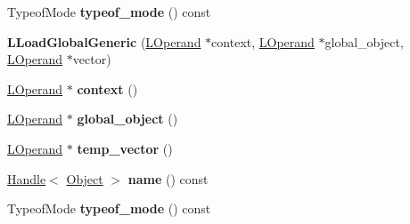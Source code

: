 \begin{DoxyCompactItemize}
\item 
Typeof\+Mode {\bfseries typeof\+\_\+mode} () const \hypertarget{classv8_1_1internal_1_1_l_load_global_generic_a92314902b26af0eba30f17b3c9e9d768}{}\label{classv8_1_1internal_1_1_l_load_global_generic_a92314902b26af0eba30f17b3c9e9d768}

\item 
{\bfseries L\+Load\+Global\+Generic} (\hyperlink{classv8_1_1internal_1_1_l_operand}{L\+Operand} $\ast$context, \hyperlink{classv8_1_1internal_1_1_l_operand}{L\+Operand} $\ast$global\+\_\+object, \hyperlink{classv8_1_1internal_1_1_l_operand}{L\+Operand} $\ast$vector)\hypertarget{classv8_1_1internal_1_1_l_load_global_generic_a5992cad6cdc59da767d3d35fdbf4c4f7}{}\label{classv8_1_1internal_1_1_l_load_global_generic_a5992cad6cdc59da767d3d35fdbf4c4f7}

\item 
\hyperlink{classv8_1_1internal_1_1_l_operand}{L\+Operand} $\ast$ {\bfseries context} ()\hypertarget{classv8_1_1internal_1_1_l_load_global_generic_acb9446dcc83f4319988b01ff0d957bf6}{}\label{classv8_1_1internal_1_1_l_load_global_generic_acb9446dcc83f4319988b01ff0d957bf6}

\item 
\hyperlink{classv8_1_1internal_1_1_l_operand}{L\+Operand} $\ast$ {\bfseries global\+\_\+object} ()\hypertarget{classv8_1_1internal_1_1_l_load_global_generic_a43bc76ffc93765b0231ba74a702acb19}{}\label{classv8_1_1internal_1_1_l_load_global_generic_a43bc76ffc93765b0231ba74a702acb19}

\item 
\hyperlink{classv8_1_1internal_1_1_l_operand}{L\+Operand} $\ast$ {\bfseries temp\+\_\+vector} ()\hypertarget{classv8_1_1internal_1_1_l_load_global_generic_a6e6428d159408fa7d9a31d38cc08919c}{}\label{classv8_1_1internal_1_1_l_load_global_generic_a6e6428d159408fa7d9a31d38cc08919c}

\item 
\hyperlink{classv8_1_1internal_1_1_handle}{Handle}$<$ \hyperlink{classv8_1_1internal_1_1_object}{Object} $>$ {\bfseries name} () const \hypertarget{classv8_1_1internal_1_1_l_load_global_generic_a8986cdf04702fb63aee12526199431ab}{}\label{classv8_1_1internal_1_1_l_load_global_generic_a8986cdf04702fb63aee12526199431ab}

\item 
Typeof\+Mode {\bfseries typeof\+\_\+mode} () const \hypertarget{classv8_1_1internal_1_1_l_load_global_generic_a92314902b26af0eba30f17b3c9e9d768}{}\label{classv8_1_1internal_1_1_l_load_global_generic_a92314902b26af0eba30f17b3c9e9d768}


\end{DoxyCompactItemize}

